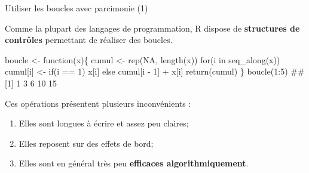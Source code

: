 \documentclass[12pt,handout,ignorenonframetext,]{beamer}
\newenvironment{Shaded}{}{}
\newcommand{\KeywordTok}[1]{\textcolor[rgb]{0.00,0.00,1.00}{{#1}}}
\newcommand{\DecValTok}[1]{{#1}}
\newcommand{\StringTok}[1]{\textcolor[rgb]{0.00,0.50,0.50}{{#1}}}
\newcommand{\OtherTok}[1]{\textcolor[rgb]{1.00,0.25,0.00}{{#1}}}
\newcommand{\NormalTok}[1]{{#1}}
\providecommand{\tightlist}{%
\setlength{\itemsep}{0pt}\setlength{\parskip}{0pt}}
\renewenvironment{Shaded}{\begin{snugshade}}{\end{snugshade}}
\begin{document}
\begin{frame}[fragile]{Utiliser les boucles avec parcimonie (1)}

Comme la plupart des langages de programmation, R dispose de
\textbf{structures de contrôles} permettant de réaliser des boucles.

\footnotesize

\begin{Shaded}
\begin{Highlighting}[]
\NormalTok{boucle <-}\StringTok{ }\NormalTok{function(x)\{}
  \NormalTok{cumul <-}\StringTok{ }\KeywordTok{rep}\NormalTok{(}\OtherTok{NA}\NormalTok{, }\KeywordTok{length}\NormalTok{(x))}
  \NormalTok{for(i in }\KeywordTok{seq_along}\NormalTok{(x)) }
    \NormalTok{cumul[i] <-}\StringTok{ }\NormalTok{if(i ==}\StringTok{ }\DecValTok{1}\NormalTok{) x[i] else cumul[i -}\StringTok{ }\DecValTok{1}\NormalTok{] +}\StringTok{ }\NormalTok{x[i]}
  \KeywordTok{return}\NormalTok{(cumul)}
\NormalTok{\}}
\KeywordTok{boucle}\NormalTok{(}\DecValTok{1}\NormalTok{:}\DecValTok{5}\NormalTok{)}
  \NormalTok{## [1]  1  3  6 10 15}
\end{Highlighting}
\end{Shaded}

\pause \normalsize
Ces opérations présentent plusieurs inconvénients :

\begin{enumerate}
\def\labelenumi{\arabic{enumi}.}
\tightlist
\item
  Elles sont longues à écrire et assez peu claires;
\item
  Elles reposent sur des effets de bord;
\item
  Elles sont en général très peu \textbf{efficaces algorithmiquement}.
\end{enumerate}

\end{frame}
\end{document}
